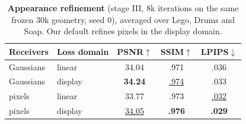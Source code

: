 \begin{table}[t]
\caption{\textbf{Appearance refinement} (stage III, 8k iterations on the same frozen 30k geometry, seed 0), averaged over Lego, Drums and Soap. Our default refines pixels in the display domain.}
\label{tab:refine}
\centering\small
\begin{tabular}{@{}llccc@{}}
\toprule
Receivers & Loss domain & PSNR$\uparrow$ & SSIM$\uparrow$ & LPIPS$\downarrow$ \\
\midrule
Gaussians & linear & 34.04 & .971 & .036 \\
Gaussians & display & \textbf{34.24} & \underline{.974} & .033 \\
pixels & linear & 33.77 & .973 & \underline{.032} \\
pixels & display & \underline{34.05} & \textbf{.976} & \textbf{.029} \\
\bottomrule
\end{tabular}
\end{table}
